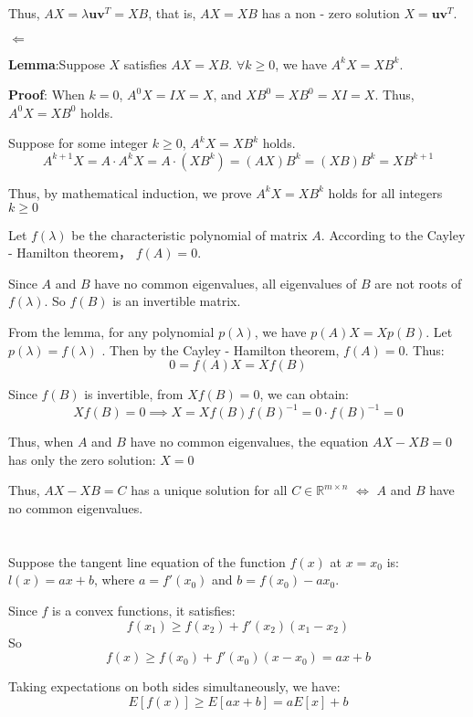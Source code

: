 \documentclass{article}
\begin{document}
Thus, $ AX = \lambda \mathbf{u} \mathbf{v}^T = XB $, that is, $ AX = XB $ has a non - zero solution $ X = \mathbf{u} \mathbf{v}^T $.

$\Leftarrow$

\textbf{Lemma}:Suppose $ X $ satisfies $ A X = X B $. $ \forall k \geq 0 $, we have $ A^k X = X B^k $.  

\textbf{Proof}: When $ k = 0 $, $ A^0 X = I X = X $, and $ X B^0 = X B^0 = X I = X $. Thus, $ A^0 X = X B^0 $ holds. 
 
Suppose for some integer $ k \geq 0 $, $ A^k X = X B^k $ holds.  
$$
A^{k + 1} X = A \cdot A^k X = A \cdot (X B^k) = (A X) B^k = (X B) B^k = X B^{k + 1}
$$  

Thus, by mathematical induction, we prove $ A^k X = X B^k $ holds for all integers $ k \geq 0 $  

Let $ f(\lambda) $ be the characteristic polynomial of matrix $ A $. According to the Cayley - Hamilton theorem， $ f(A)=0 $.  

Since $ A $ and $ B $ have no common eigenvalues, all eigenvalues of $ B $ are not roots of $ f(\lambda) $. So $ f(B) $ is an invertible matrix.  

From the lemma, for any polynomial $ p(\lambda) $, we have $ p(A) X = X p(B) $. Let $ p(\lambda)=f(\lambda) $ . Then by the Cayley - Hamilton theorem, $ f(A)=0 $. Thus:  
$$
0 = f(A) X = X f(B)
$$  

Since $ f(B) $ is invertible, from $ X f(B)=0 $, we can obtain:  
$$
X f(B)=0 \implies X = X f(B) f(B)^{-1}=0 \cdot f(B)^{-1}=0
$$  

Thus, when $ A $ and $ B $ have no common eigenvalues, the equation $ A X - X B = 0 $ has only the zero solution:  $X = 0$

Thus, $ AX - XB = C $ has a unique solution for all $ C \in \mathbb{R}^{m \times n} $ $ \Leftrightarrow $ $ A $ and $ B $ have no common eigenvalues.

\section{}
Suppose the tangent line equation of the function $ f(x) $ at $ x = x_0 $ is:$l(x)=ax + b$, where $ a = f'(x_0) $ and $ b = f(x_0)-ax_0 $.

Since $f$ is a convex functions, it satisfies:
$$
f(x_1)\geq f(x_2)+f'(x_2)(x_1 - x_2)
$$
So
$$
f(x)\geq f(x_0)+f'(x_0)(x - x_0)=ax + b
$$

Taking expectations on both sides simultaneously, we have:
$$
E[f(x)]\geq E[ax + b]=aE[x]+b
$$
\end{document}
